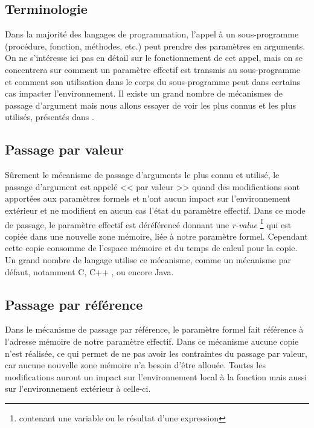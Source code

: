     \subsection{Terminologie}
    
      \label{sec:arguments}
            
   Dans la majorité des langages de programmation, l'appel à un sous-programme (procé\-dure, fonction, méthodes, etc.) peut prendre des paramètres en arguments. On ne s'inté\-resse ici pas en détail sur le fonctionnement de cet appel, mais on se concentrera sur comment un paramètre effectif est transmis au sous-programme et comment son utilisation dans le corps du sous-programme peut dans certains cas impacter l'environnement. Il existe un grand nombre de mécanismes de passage d'argument mais nous allons essayer de voir les plus connus et les plus utilisés, présentés dans \cite{Horowitz:1984:FPL:27635}.
  
    \subsection{Passage par valeur}
      
      Sûrement le mécanisme de passage d'arguments le plus connu et utilisé, le passage d'argument est appelé << par valeur >> quand des modifications sont apportées aux paramètres formels et n'ont aucun impact sur l'environnement extérieur et ne modifient en aucun cas l'état du paramètre effectif. Dans ce mode de passage, le paramètre effectif est déréférencé donnant une \emph{r-value} \footnote{contenant une variable ou le résultat d'une expression} qui est copiée dans une nouvelle zone mémoire, liée à notre paramètre formel. Cependant cette copie consomme de l'espace mémoire et du temps de calcul pour la copie. Un grand nombre de langage utilise ce mécanisme, comme un mécanisme par défaut, notamment C, C++ \cite{Stroustrup:2000:CPL:518791}, ou encore Java.

    \subsection{Passage par référence}
    
     Dans le mécanisme de passage par référence, le paramètre formel fait référence à l'adresse mémoire de notre paramètre effectif. Dans ce mécanisme aucune copie n'est réalisée, ce qui permet de ne pas avoir les contraintes du passage par valeur, car aucune nouvelle zone mémoire n'a besoin d'être allouée. Toutes les modifications auront un impact sur l'environnement local à la fonction mais aussi sur l'environnement extérieur à celle-ci.  
    
